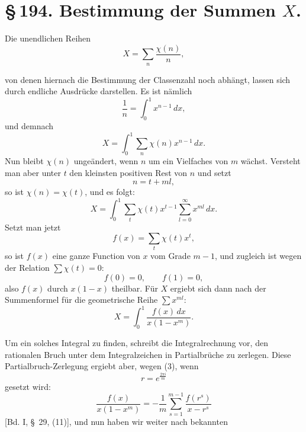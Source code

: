 \documentclass[11pt]{article}
\begin{document}
\section*{\S\,194. Bestimmung der Summen $X$.}

Die unendlichen Reihen
\begin{equation}
X=\sum_n\frac{\chi(n)}{n},
\tag{1}
\end{equation}

von denen hiernach die Bestimmung der Classenzahl noch abhängt, lassen sich durch endliche Ausdrücke darstellen. Es ist nämlich
\[
\frac1n=\int_0^1x^{n-1}\,dx,
\]
und demnach
\[
X=\int_0^1\sum_n\chi(n)x^{n-1}\,dx.
\]
Nun bleibt $\chi(n)$ ungeändert, wenn $n$ um ein Vielfaches von $m$ wächst. Versteht man aber unter $t$ den kleinsten positiven Rest von $n$ und setzt
\[
n=t+ml,
\]
so ist $\chi(n)=\chi(t)$, und es folgt:
\[
X=\int_0^1\sum_t\chi(t)x^{t-1}\sum_{l=0}^{\infty}x^{ml}\,dx.
\]
Setzt man jetzt
\begin{equation}
f(x)=\sum_t\chi(t)x^t,
\tag{2}
\end{equation}
so ist $f(x)$ eine ganze Function von $x$ vom Grade $m-1$, und zugleich ist wegen der Relation $\sum\chi(t)=0$:
\begin{equation}
f(0)=0,\qquad f(1)=0,
\tag{3}
\end{equation}
also $f(x)$ durch $x(1-x)$ theilbar. Für $X$ ergiebt sich dann nach der Summenformel für die geometrische Reihe $\sum x^{ml}$:
\begin{equation}
X=\int_0^1\frac{f(x)\,dx}{x(1-x^m)}.
\tag{4}
\end{equation}

Um ein solches Integral zu finden, schreibt die Integralrechnung vor, den rationalen Bruch unter dem Integralzeichen in Partialbrüche zu zerlegen. Diese Partialbruch-Zerlegung ergiebt aber, wegen (3), wenn
\[
r=e^{\frac{2\pi i}{m}}
\]
gesetzt wird:
\[
\frac{f(x)}{x(1-x^m)}
=-\frac1m\sum_{s=1}^{m-1}\frac{f(r^s)}{x-r^s}
\]
[Bd. I, \S~29, (11)], und nun haben wir weiter nach bekannten
\end{document}
